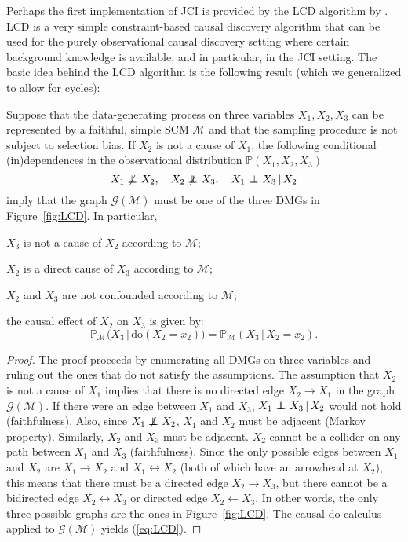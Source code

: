 \documentclass[twoside,11pt]{article}
\DeclareMathOperator*{\CI}{{\,\perp\mkern-12mu\perp\,}}
\DeclareMathOperator*{\nCI}{{\,\not\mkern-1mu\perp\mkern-12mu\perp\,}}
\newcommand{\Prb}{\mathbb{P}}
\newcommand\C[1]{\mathcal{#1}}
\newcommand\given{\,|\,}
\newcommand\eref[1]{(\ref{#1})}
\newcommand{\ot}{\leftarrow}
\newcommand{\oto}{\leftrightarrow}
\newcommand{\intervene}{\mathrm{do}}
\newcommand{\Tom}[1] {{\color{green}#1}}
\begin{document}
Perhaps the first implementation of JCI is provided by the LCD algorithm by \citet{Cooper1997}.
LCD is a very simple constraint-based causal discovery algorithm that can be used
for the purely observational causal discovery setting where certain background knowledge is available,
and in particular, in the JCI setting. The basic idea behind the LCD algorithm is the following result
(which we generalized to allow for cycles):
\begin{proposition}\label{prop:LCD}
  Suppose that the data-generating process on three variables $X_1,X_2,X_3$ can be represented by a faithful,
  simple SCM $\C{M}$ and that the sampling procedure is not subject to selection bias.
  If $X_2$ is not a cause of $X_1$, 
  the following conditional (in)dependences in the observational distribution $\Prb(X_1,X_2,X_3)$
  $$X_1 \nCI X_2, \quad X_2 \nCI X_3, \quad X_1 \CI X_3 \given X_2$$
  imply that the graph $\C{G}(\C{M})$ must be one of the three DMGs in Figure~\ref{fig:LCD}. In particular,
  \begin{compactenum}[(i)]
  \item $X_3$ is not a cause of $X_2$ according to $\C{M}$;
  \item $X_2$ is a direct cause of $X_3$ according to $\C{M}$;
  \item $X_2$ and $X_3$ are not confounded according to $\C{M}$;
  \item the causal effect of $X_2$ on $X_3$ is given by:
    \begin{equation}\label{eq:LCD}
      \Prb_{\C{M}}\big(X_3 \given \intervene(X_2=x_2)\big) = \Prb_{\C{M}}(X_3 \given X_2=x_2).
    \end{equation}
  \end{compactenum}
\end{proposition}
\begin{proof}
The proof proceeds by enumerating all DMGs on three variables and ruling out the ones that do not
satisfy the assumptions.
The assumption that $X_2$ is not a cause of $X_1$ implies that there is no directed edge
$X_2 \to X_1$ in the graph $\C{G}(\C{M})$. If there were an edge between $X_1$ and $X_3$,
$X_1 \CI X_3 \given X_2$ would not hold (faithfulness). Also, since $X_1 \nCI X_2$, $X_1$ and
$X_2$ must be adjacent (Markov property). Similarly, $X_2$ and $X_3$ must be adjacent. $X_2$ cannot be
a collider on any path between $X_1$ and $X_3$ (faithfulness). Since the only possible edges between
$X_1$ and $X_2$ are $X_1 \to X_2$ and $X_1 \oto X_2$ (both of which have an arrowhead at $X_2$), 
this means that there must be a
directed edge $X_2 \to X_3$, but there cannot be a  bidirected edge $X_2 \oto X_3$ or directed edge $X_2 \ot X_3$. 
In other words, the only three possible graphs are the ones in Figure~\ref{fig:LCD}.
The causal do-calculus applied to $\C{G}(\C{M})$ yields \eref{eq:LCD}.
\end{proof}
\end{document}

